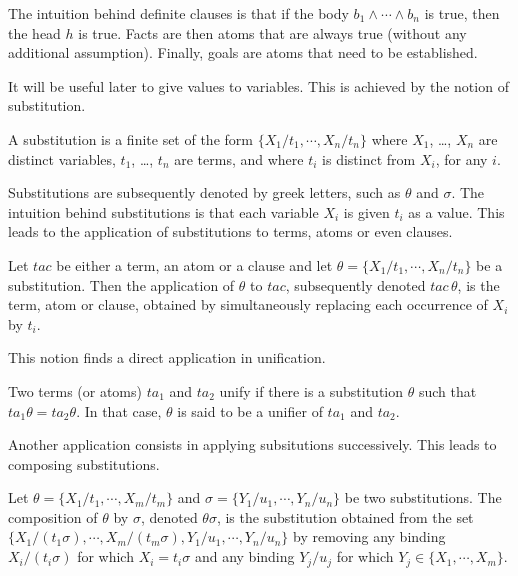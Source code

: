 The intuition behind definite clauses is that if the body
$b_1 \wedge \cdots \wedge b_n$ is true, then the head $h$ is true. Facts are then atoms
that are always true (without any additional assumption). Finally,
goals are atoms that need to be established.

It will be useful later to give values to variables. This is achieved by the notion of substitution.

\begin{definition}
A substitution is a finite set of the form
\( \{ X_1/t_1, \cdots, X_n/t_n \} \)
where $X_1$, \ldots, $X_n$ are distinct variables,
$t_1$, \ldots, $t_n$ are terms, and where $t_i$ is distinct from $X_i$,
for any $i$.
\end{definition}

Substitutions are subsequently denoted by greek letters, such as $\theta$ and $\sigma$.
The intuition behind substitutions is that each variable $X_i$ is
given $t_i$ as a value. This leads to the application of substitutions
to terms, atoms or even clauses.

\begin{sloppypar}
\begin{definition}
Let $tac$ be either a term, an atom or a clause and let
$\theta= \{ X_1/t_1, \cdots, X_n/t_n \}$
be a substitution. Then the application of $\theta$ to $tac$,
subsequently denoted $tac \, \theta$, is the term, atom or clause,
obtained by simultaneously replacing each occurrence of $X_i$ by
$t_i$.
\end{definition}
\end{sloppypar}
  
This notion finds a direct application in unification.

\begin{definition}
Two terms (or atoms) $ta_1$ and $ta_2$ unify if there is a
substitution $\theta$ such that \( ta_1\theta = ta_2\theta \).  In
that case, $\theta$ is said to be a unifier of $ta_1$ and $ta_2$.
\end{definition}

Another application consists in applying subsitutions
successively. This leads to composing substitutions.

\begin{definition}
Let $\theta = \{ X_1/t_1, \cdots, X_m/t_m \}$ and
$\sigma = \{ Y_1/u_1, \cdots, Y_n/u_n \}$
be two substitutions. The composition of $\theta$ by $\sigma$, denoted
$\theta\sigma$, is the substitution obtained from the set
$\{ X_1/(t_1\sigma), \cdots, X_m/(t_m\sigma), Y_1/u_1, \cdots, Y_n/u_n \}$
by removing any binding $X_i/(t_i\sigma)$ for which $X_i = t_i\sigma$
and any binding $Y_j/u_j$ for which $Y_j \in \{ X_1, \cdots, X_m \}$.
\end{definition}

